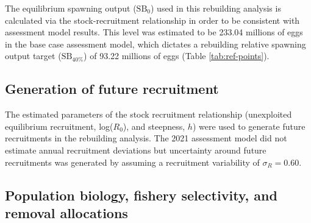 \documentclass[11pt,
  english,
  a4paper,
]{article}
\begin{document}
\leavevmode\tagmcend\tagstructend


The equilibrium spawning output ({\(\text{SB}_0\)\leavevmode\tagmcend\tagstructend}) used in this rebuilding analysis is calculated via the stock-recruitment relationship in order to be consistent with assessment model results. This level was estimated to be 233.04 millions of eggs in the base case assessment model, which dictates a rebuilding relative spawning output target ({\(\text{SB}_{40\%}\)\leavevmode\tagmcend\tagstructend}) of 93.22 millions of eggs (Table \ref{tab:ref-points}).

\leavevmode\tagmcend\tagstructend\par


\hypertarget{generation-of-future-recruitment}{%
\subsection{Generation of future recruitment}\label{generation-of-future-recruitment}}

\leavevmode\tagmcend\tagstructend


The estimated parameters of the stock recruitment relationship (unexploited equilibrium recruitment, log({\(R_0\)\leavevmode\tagmcend\tagstructend}), and steepness, {\(h\)\leavevmode\tagmcend\tagstructend}) were used to generate future recruitments in the rebuilding analysis. The 2021 assessment model did not estimate annual recruitment deviations but uncertainty around future recruitments was generated by assuming a recruitment variability of {\(\sigma_R = 0.60\)\leavevmode\tagmcend\tagstructend}.

\leavevmode\tagmcend\tagstructend\par


\hypertarget{population-biology-fishery-selectivity-and-removal-allocations}{%
\subsection{Population biology, fishery selectivity, and removal allocations}\label{population-biology-fishery-selectivity-and-removal-allocations}}
\end{document}

